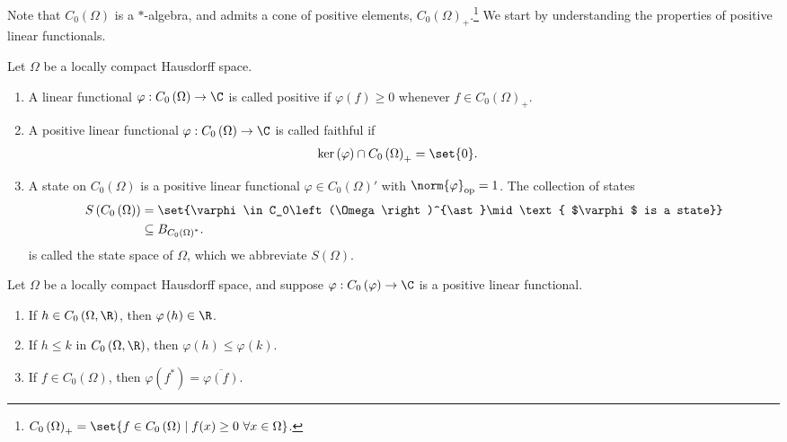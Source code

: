 \documentclass[10pt]{mypackage}
\begin{document}
Note that $C_0\left(\Omega\right)$ is a $\ast$-algebra, and admits a cone of positive elements, $C_0\left(\Omega\right)_{+}$.\footnote{$C_0\left(\Omega\right)_{+} = \set{f\in C_0\left(\Omega\right)\mid f(x)\geq 0~\forall x\in \Omega}$.} We start by understanding the properties of positive linear functionals.
\begin{definition}
  Let $\Omega$ be a locally compact Hausdorff space.
  \begin{enumerate}[(1)]
    \item A linear functional $\varphi: C_0\left(\Omega\right)\rightarrow \C$ is called positive if $\varphi(f) \geq 0$ whenever $f\in C_0\left(\Omega\right)_{+}$.
    \item A positive linear functional $\varphi: C_0\left(\Omega\right)\rightarrow \C$ is called faithful if
      \begin{align*}
        \ker\left(\varphi\right)\cap C_0\left(\Omega\right)_{+} &= \set{0}.
      \end{align*}
    \item A state on $C_0\left(\Omega\right)$ is a positive linear functional $\varphi\in C_0\left(\Omega\right)'$ with $\norm{\varphi}_{\text{op}} = 1$. The collection of states
      \begin{align*}
        S\left(C_0\left(\Omega\right)\right) &= \set{\varphi\in C_0\left(\Omega\right)^{\ast}\mid \text{ $\varphi$ is a state}}\\
                                             &\subseteq B_{C_{0}\left(\Omega\right)^{\ast}}.
      \end{align*}
      is called the state space of $\Omega$, which we abbreviate $S\left(\Omega\right)$.
  \end{enumerate}
\end{definition}
\begin{lemma}
  Let $\Omega$ be a locally compact Hausdorff space, and suppose $\varphi: C_0\left(\varphi\right)\rightarrow \C$ is a positive linear functional.
  \begin{enumerate}[(1)]
    \item If $h\in C_0\left(\Omega,\R\right)$, then $\varphi\left(h\right)\in \R$.
    \item If $h\leq k$ in $C_0\left(\Omega,\R\right)$, then $\varphi\left(h\right) \leq \varphi\left(k\right)$.
    \item If $f\in C_0\left(\Omega\right)$, then $\varphi\left(f^{\ast}\right) = \overline{\varphi\left(f\right)}$.
  \end{enumerate}
\end{lemma}
\end{document}
